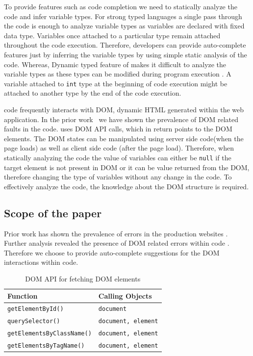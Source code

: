 		To provide features such as code completion we need to statically analyze the code and infer variable types. For strong typed languages a single pass through the code is enough to analyze variable types as variables are declared with fixed data type. Variables once attached to a particular type remain attached throughout the code execution. Therefore, developers can provide auto-complete features just by inferring the variable types by using simple static analysis of the code. Whereas, Dynamic typed feature of \javascript makes it difficult to analyze the variable types as these types can be modified during program execution \cite{hackett2012fast, kashyap2013type}. A variable attached to \texttt{int} type at the beginning of code execution might be attached to another type by the end of the code execution. 

	
	 \javascript code frequently interacts with DOM, \ie dynamic HTML generated within the web application. In the prior work~\cite{ocariza2013empirical} we have shown the prevalence of DOM related faults in the \javascript  code. \javascript uses DOM API calls, which in return points to the DOM elements. The DOM states can be manipulated using server side code(when the page loads) as well as client side code (after the page load). Therefore, when statically analyzing the \javascript code the value of variables can either be \texttt{null} if the target element is not present in DOM or it can be value returned from the DOM, therefore changing the type of \javascript variables without any change in the \javascript code. To effectively analyze the \javascript code, the knowledge about the DOM structure is required. 
	
	\subsection{Scope of the paper}
	\label{Sec:Scope}
	
	Prior work  has shown the prevalence of \javascript errors in the production websites \cite{ocariza2011javascript}. Further analysis revealed the presence of DOM related errors within \javascript code \cite{ocariza2013empirical}. Therefore we choose to provide auto-complete suggestions for the DOM interactions within \javascript code. 
	
	\begin{table}
	{
		\scriptsize
		\begin{tabular}{ p{3.8cm} | p{3.8cm}}
  			\hline                        
  			\textbf{Function} & \textbf{Calling Objects} \\ \hline \hline
  			\texttt{getElementById()} & \texttt{document} \\ \hline
			\texttt{querySelector()} & \texttt{document, element} \\ \hline
			\texttt{getElementsByClassName()} & \texttt{document, element} \\ \hline
			\texttt{getElementsByTagName()} & \texttt{document, element} \\
  			\hline  
		\end{tabular}
	}
	\caption {DOM API for fetching DOM elements}
	\label{Table:API}		
	\end{table}

